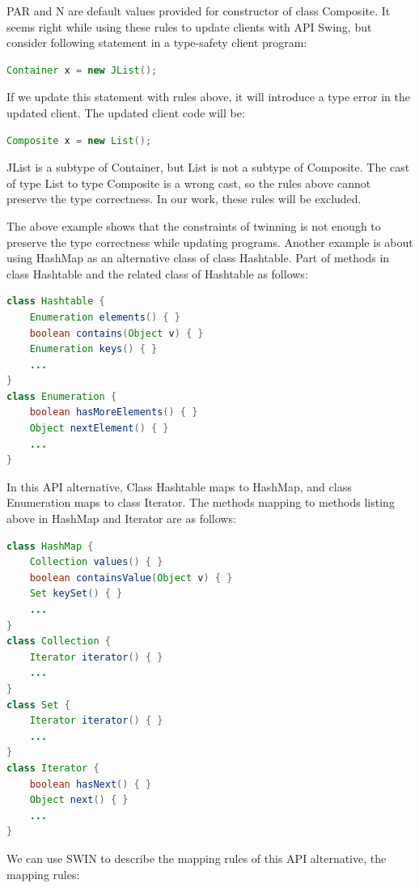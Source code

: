 \noindent PAR and N are default values provided for constructor of class Composite.
It seems right while using these rules to update clients with API Swing, 
but consider following statement in a type-safety client program:

\begin{lstlisting}[language=Java]
Container x = new JList();
\end{lstlisting}

\noindent If we update this statement with rules above, it will introduce a type error 
in the updated client.
The updated client code will be:
\begin{lstlisting}[language=Java]
Composite x = new List(); 
\end{lstlisting}
JList is a subtype of Container, but List is not a subtype of Composite. The cast of type List
to type Composite is a wrong cast, so the rules above cannot preserve the type correctness.
In our work, these rules will be excluded. 

The above example shows that the constraints of twinning is not enough to preserve the type
correctness while updating programs. Another example is about using HashMap as an alternative
class of class Hashtable. Part of methods in class Hashtable and the related class of Hashtable
as follows:

\begin{lstlisting}[language=java]
class Hashtable {
    Enumeration elements() { }
    boolean contains(Object v) { }
    Enumeration keys() { }
    ...
}
class Enumeration {
    boolean hasMoreElements() { }
    Object nextElement() { }
    ...
}
\end{lstlisting}

In this API alternative,
Class Hashtable maps to HashMap, and class Enumeration maps to class Iterator. The methods mapping
to methods listing above in HashMap and Iterator are as follows:

\begin{lstlisting}[language=java]
class HashMap {
    Collection values() { }            
    boolean containsValue(Object v) { }
    Set keySet() { }
    ...
}
class Collection {
    Iterator iterator() { }
    ...
}
class Set { 
    Iterator iterator() { }
    ...
}
class Iterator {
    boolean hasNext() { }
    Object next() { }
    ...
}
\end{lstlisting}

We can use SWIN to describe the mapping rules of this API alternative, the mapping rules:

